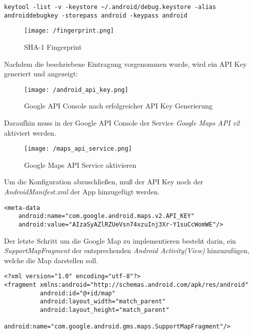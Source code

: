 \begin{lstlisting}[caption={Fingerprint Ausgabe},label=lst:FingerprintOutput]
keytool -list -v -keystore ~/.android/debug.keystore -alias androiddebugkey -storepass android -keypass android
\end{lstlisting}

\begin{figure}[H]
\centering
\texttt{[image: /fingerprint.png]}
\caption{SHA-1 Fingerprint}
\label{fig:fingerprint}
\end{figure}
\bigskip
Nachdem die beschriebene Eintragung vorgenommen wurde, wird ein API Key generiert und angezeigt:

\begin{figure}[H]
\centering
\texttt{[image: /android\_api\_key.png]}
\caption{Google API Console nach erfolgreicher API Key Generierung}
\label{fig:apiKeyGen}
\end{figure}
\bigskip
Daraufhin muss in der Google API Console der Service \textit{Google Maps API v2} aktiviert werden.

\begin{figure}[H]
\centering
\texttt{[image: /maps\_api\_service.png]}
\caption{Google Maps API Service aktivieren}
\label{fig:fingerprint}
\end{figure} 
\bigskip
Um die Konfiguration abzuschließen, muß der API Key noch der \textit{AndroidManifest.xml} der App hinzugefügt werden.

\begin{lstlisting}[caption={Google Map API Key hinzufügen},label=lst:MapApiKeyInsert]
<meta-data
    android:name="com.google.android.maps.v2.API_KEY"
    android:value="AIzaSyAZlRZUeVsn74xzuInj3Xr-Y1suCcWomWE"/>
\end{lstlisting}
\bigskip
Der letzte Schritt um die Google Map zu implementieren besteht darin, ein \textit{SupportMapFragment} der entsprechenden \textit{Android Activity(View)} hinzuzufügen, welche die Map darstellen soll.

\begin{lstlisting}[caption={SupportMapFragment hinzufügen},label=lst:SupportMapFragmentInsert]
<?xml version="1.0" encoding="utf-8"?>
<fragment xmlns:android="http://schemas.android.com/apk/res/android"
          android:id="@+id/map"
          android:layout_width="match_parent"
          android:layout_height="match_parent"
          android:name="com.google.android.gms.maps.SupportMapFragment"/>
\end{lstlisting}

